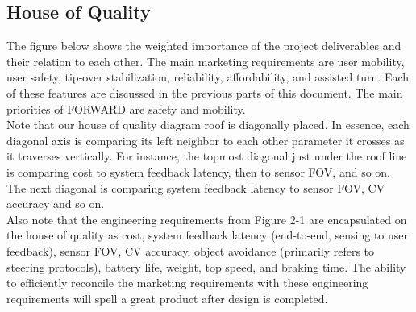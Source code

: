 \subsection{House of Quality}
\indent The figure below shows the weighted importance of the project deliverables and their relation to each other. The main marketing requirements are user mobility, user safety, tip-over stabilization, reliability, affordability, and assisted turn. Each of these features are discussed in the previous parts of this document. The main priorities of FORWARD are safety and mobility. 
\\


\noindent Note that our house of quality diagram roof is diagonally placed. In essence, each diagonal axis is comparing its left neighbor to each other parameter it crosses as it traverses vertically. For instance, the topmost diagonal just under the roof line is comparing cost to system feedback latency, then to sensor FOV, and so on. The next diagonal is comparing system feedback latency to sensor FOV, CV accuracy and so on. 
\\

\noindent
Also note that the engineering requirements from Figure 2-1 are encapsulated on the house of quality as cost, system feedback latency (end-to-end, sensing to user feedback), sensor FOV, CV accuracy, object avoidance (primarily refers to steering protocols), battery life, weight, top speed, and braking time. The ability to efficiently reconcile the marketing requirements with these engineering requirements will spell a great product after design is completed. 